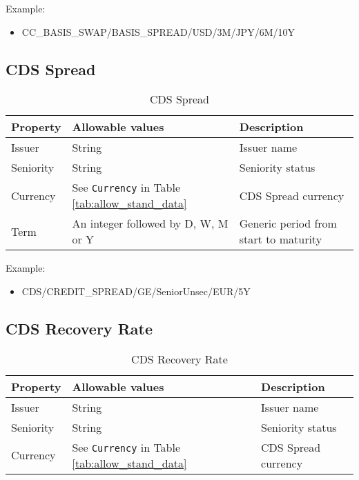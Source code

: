 \medskip
Example: 
\begin{itemize}
\item {CC\_BASIS\_SWAP/BASIS\_SPREAD/USD/3M/JPY/6M/10Y}
\end{itemize}

\subsection{CDS Spread}

\begin{table}[H]
\centering
\begin{tabular}{|p{3cm}|p{3.5cm}|p{7cm}|}
\hline
{\bf Property} & {\bf Allowable values} & {\bf Description} \\
\hline
Issuer & String &  Issuer name \\ \hline
Seniority & String &  Seniority status \\ \hline
Currency & See \lstinline!Currency! in Table \ref{tab:allow_stand_data} & CDS Spread currency\\ \hline
Term & An integer followed by D, W, M or Y & Generic period from start to maturity\\
\hline
\end{tabular}
  \caption{CDS Spread}
  \label{tab:cdsspread_quote}
\end{table}
 
Example: 
\begin{itemize}
\item {CDS/CREDIT\_SPREAD/GE/SeniorUnsec/EUR/5Y}
\end{itemize}

\subsection{CDS Recovery Rate}

\begin{table}[H]
\centering
\begin{tabular}{|p{3cm}|p{3.5cm}|p{7cm}|}
\hline
{\bf Property} & {\bf Allowable values} & {\bf Description} \\
\hline
Issuer & String &  Issuer name \\ \hline
Seniority & String &  Seniority status \\ \hline
Currency & See \lstinline!Currency! in Table \ref{tab:allow_stand_data} & CDS Spread currency\\
\hline
\end{tabular}
  \caption{CDS Recovery Rate}
  \label{tab:cdsrecovery_quote}
\end{table}
 
